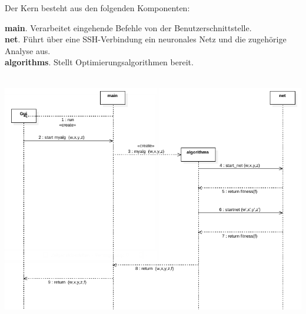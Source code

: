 Der Kern besteht aus den folgenden Komponenten:\\
	\begin{samepage}
	\textbf{main}. Verarbeitet eingehende Befehle von der Benutzerschnittstelle.\\
	\textbf{net}. Führt über eine SSH-Verbindung ein neuronales Netz und die zugehörige Analyse aus.\\
	\textbf{algorithms}. Stellt Optimierungsalgorithmen bereit. 
	\end{samepage}
	\mbox{}\\
	
	\includegraphics[scale=0.55]{../presentation/sequenz.png}
